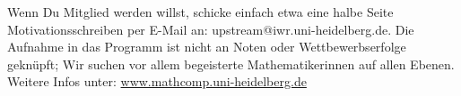 Wenn Du Mitglied werden willst, schicke einfach etwa eine halbe Seite
Motivationsschreiben per E-Mail an: upstream@iwr.uni-heidelberg.de. Die Aufnahme
in das Programm ist nicht an Noten oder Wettbewerbserfolge geknüpft; Wir suchen
vor allem begeisterte Mathematikerinnen auf allen Ebenen.  Weitere Infos unter:
\url{www.mathcomp.uni-heidelberg.de}
